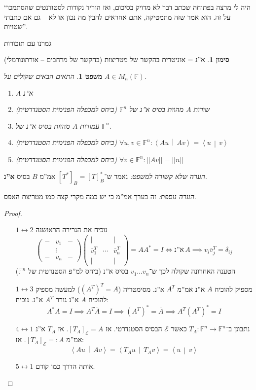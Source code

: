 \documentclass[]{article}
\newcommand\ec    {\mathcal{E}}
\newcommand\ra    {\rangle}
\newcommand\la    {\langle}
\newcommand\lra       {\leftrightarrow}
\newcommand\F         {\mathbb{F}}
\newcommand\co        {\colon}
\newcommand\pms[1]    {\begin{pmatrix}
		#1
\end{pmatrix}}
\newcommand\norm[1]   {\left \vert \left \vert #1 \right \vert \right \vert}
\newcommand\mut[2]    {\left \la #1 \,\middle\vert\, #2 \right \ra}
\newcommand\dg        {\delta}
\newtheorem{Theorem}{משפט}
\theoremstyle{definition}
\newtheorem{Notion}{סימון}
\newcommand\theo  [1] {\begin{Theorem}#1\end{Theorem}}
\newcommand\noti  [1] {\begin{Notion}#1\end{Notion}}
\begin{document}
	``היה לי מרצה בפתוחה שכתב דבר לא מדויק בסיכום, ואז הוריד נקודות לסטודנטים שהסתמכו על זה. הוא אמר שזה מתמטיקה, אתם אחראים להבין מה נכון או לא – גם אם כתבתי שטויות''. 
	
	\dotfill
	
	גמרנו עם תזכורות
	
	\noti{א''נ = אוניטרית בהקשר של מטריצות (בהקשר של מרחבים – אורתונורמלי)}
	\theo{התאים הבאים שקולים על $A \in M_n(\F)$. 
	\begin{enumerate}
		\item $A$ א''נ
		\item שורות $A$ מהוות בסיס א''נ של $\F^n$ (ביחס למכפלה הפנימית הסטנדרטית)
		\item עמודות $A$ מהוות בסיס א''נ של $\F^n$. 
		\item (ביחס למכפלה הפנימית הסטנדרטית) \hfil $\forall u, v \in \F^n \co \mut{Au}{Av} = \mut{u}{v}$
		\item (ביחס למכפלה הפנימית הסטנדרטית) \hfil $\forall v \in \F^n \co \norm{Av} = \norm{n}$
	\end{enumerate}}
	\textit{הערה שלא קשורה למשפט: }נאמר ש־$[T^*]_B = [T]_B^*$ אמ''מ $B$ בסיס \textbf{א''נ}. 
	
	\textit{הערה נוספת: }זה בערך אמ''מ כי יש כמה מקרי קצה כמו מטריצת האפס. 
	
	\begin{proof}\,
		\begin{itemize}
			\item[$1 \lra 2$] נוכיח את הגרירה הראושנה
			\[ \pms{- & v_1 & - \\ & \vdots \\ - & v_n & -}\pms{\vert & & \vert\\ \bar v_1^T & \cdots & \bar v_n^T \\ \vert & & \vert} = AA^* = I \iff \text{א''נ}\, A \implies v_i \bar v_j^T = \dg_{ij} \] 
			הטענה האחרונה שקולה לכך ש־$v_1 \dots v_n$ בסיס א''נ (ביחס למ''פ הסטנדטית של $\F^n$)
			\item[$1 \lra 3$]מספיק להוכיח $A$ א''נ אמ''מ $A^T$ א''נ. מסימטריה ($(A^T)^T = A$) למעשה מספיק להוכיח $A$ א''נ גורר $A^T$ א''נ. נוכיח: 
			\[ A^*A = I \implies A^T\bar A = I \implies (A^T)^* = \bar A \implies A^T(A^T)^* = I \]
			\item[$4 \lra 1$]נתבונן ב־$T_A \co \F^n \to \F^n$ כאשר $\ec$ הבסיס הסטנדרטי. אז $[T_A]_{\ec} = A$. אז $T_A$ א''נ אמ''מ $[T_A]_{\ec} =: A$. אז: 
			\[ \mut{Au}{Av} = \mut{T_Au}{T_Av} = \mut{u}{v} \]
			\item[$5 \lra 1$] אותה הדרך כמו קודם. 
		\end{itemize}
	\end{proof}
	
\end{document}
